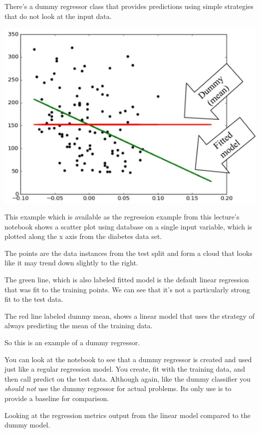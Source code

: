 \begin{multicols}{2}
There's a dummy regressor class that provides predictions using simple strategies that do not look at the input data.
 
\begin{center}
\includegraphics[width=\linewidth]{img/Dummy-Regressor.png}
\end{center}

This example which is available as the regression example from this lecture's notebook shows a scatter plot using database on a single input variable, which is plotted along the x axis from the diabetes data set. 

The points are the data instances from the test split and form a cloud that looks like it may trend down slightly to the right. 

The green line, which is also labeled fitted model is the default linear regression that was fit to the training points. We can see that it’s not a particularly strong fit to the test data. 

The red line labeled dummy mean, shows a linear model that uses the strategy of always predicting the mean of the training data. 

So this is an example of a dummy regressor. 

You can look at the notebook to see that a dummy regressor is created and used just like a regular regression model. You create, fit with the training data, and then call predict on the test data. Although again, like the dummy classifier you \emph{should not} use the dummy regressor for actual problems. Its only use is to provide a baseline for comparison. 

Looking at the regression metrics output from the linear model compared to the dummy model. 


\end{multicols}
